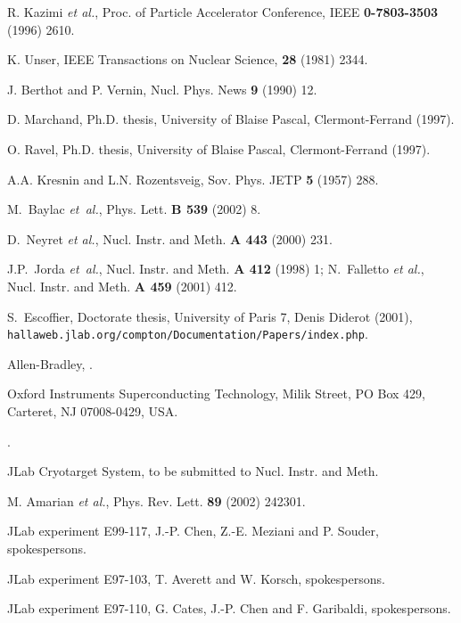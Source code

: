 \begin{thebibliography}{99}
 R. Kazimi {\it et al.}, Proc. of Particle Accelerator 
Conference,  IEEE {\bf 0-7803-3503} (1996) 2610. 

 K. Unser, 
\newblock IEEE Transactions on Nuclear Science, {\bf 28} (1981) 2344. 

 J. Berthot and P. Vernin, 
\newblock Nucl. Phys. News {\bf 9} (1990) 12.

 D. Marchand,
\newblock Ph.D. thesis, University of Blaise Pascal, Clermont-Ferrand (1997).

 O. Ravel,
\newblock Ph.D. thesis, University of Blaise Pascal, Clermont-Ferrand (1997).

 A.A. Kresnin and L.N. Rozentsveig,
Sov. Phys. JETP {\bf 5} (1957) 288.

 M.~Baylac {\em et~al.},
\newblock Phys. Lett. {\bf B 539} (2002) 8.

 D.~Neyret {\em et al.},
\newblock Nucl. Instr. and Meth. {\bf A 443} (2000) 231.

 J.P.~Jorda {\em et~al.},
\newblock Nucl. Instr. and Meth. {\bf A 412} (1998) 1;
 N.~Falletto {\it et al.}, Nucl. Instr. and Meth. {\bf A 459} (2001) 412.

 S.~Escoffier,
\newblock Doctorate thesis, University of Paris 7, Denis Diderot (2001),
{\tt hallaweb.jlab.org/compton/Documentation/Papers/index.php}.

 Allen-Bradley,
.

 Oxford Instruments Superconducting Technology,
Milik Street, PO Box 429, Carteret, NJ 07008-0429, USA.

. 

 JLab Cryotarget System,
\newblock to be submitted to Nucl. Instr. and Meth.  

 M. Amarian {\em et al.},
\newblock Phys. Rev. Lett. {\bf 89} (2002) 242301.

 JLab experiment E99-117,
\newblock J.-P. Chen, Z.-E. Meziani and P. Souder, spokespersons.

 JLab experiment E97-103,
\newblock T. Averett and W. Korsch, spokespersons.

 JLab experiment E97-110,
\newblock G. Cates, J.-P. Chen and F.  Garibaldi, spokespersons.


\end{thebibliography}

